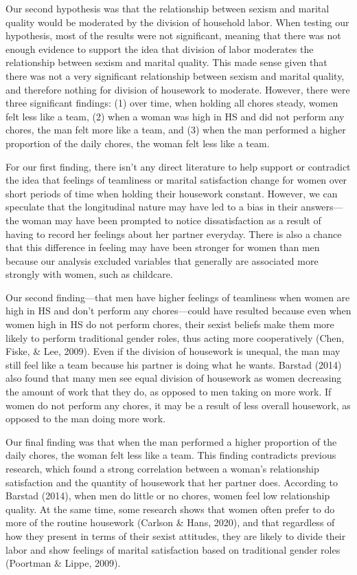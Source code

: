 \documentclass[
  man]{apa6}
\begin{document}
Our second hypothesis was that the relationship between sexism and marital quality would be moderated by the division of household labor. When testing our hypothesis, most of the results were not significant, meaning that there was not enough evidence to support the idea that division of labor moderates the relationship between sexism and marital quality. This made sense given that there was not a very significant relationship between sexism and marital quality, and therefore nothing for division of housework to moderate. However, there were three significant findings: (1) over time, when holding all chores steady, women felt less like a team, (2) when a woman was high in HS and did not perform any chores, the man felt more like a team, and (3) when the man performed a higher proportion of the daily chores, the woman felt less like a team.

For our first finding, there isn't any direct literature to help support or contradict the idea that feelings of teamliness or marital satisfaction change for women over short periods of time when holding their housework constant. However, we can speculate that the longitudinal nature may have led to a bias in their answers---the woman may have been prompted to notice dissatisfaction as a result of having to record her feelings about her partner everyday. There is also a chance that this difference in feeling may have been stronger for women than men because our analysis excluded variables that generally are associated more strongly with women, such as childcare.

Our second finding---that men have higher feelings of teamliness when women are high in HS and don't perform any chores---could have resulted because even when women high in HS do not perform chores, their sexist beliefs make them more likely to perform traditional gender roles, thus acting more cooperatively (Chen, Fiske, \& Lee, 2009). Even if the division of housework is unequal, the man may still feel like a team because his partner is doing what he wants. Barstad (2014) also found that many men see equal division of housework as women decreasing the amount of work that they do, as opposed to men taking on more work. If women do not perform any chores, it may be a result of less overall housework, as opposed to the man doing more work.

Our final finding was that when the man performed a higher proportion of the daily chores, the woman felt less like a team. This finding contradicts previous research, which found a strong correlation between a woman's relationship satisfaction and the quantity of housework that her partner does. According to Barstad (2014), when men do little or no chores, women feel low relationship quality. At the same time, some research shows that women often prefer to do more of the routine housework (Carlson \& Hans, 2020), and that regardless of how they present in terms of their sexist attitudes, they are likely to divide their labor and show feelings of marital satisfaction based on traditional gender roles (Poortman \& Lippe, 2009).
\end{document}
